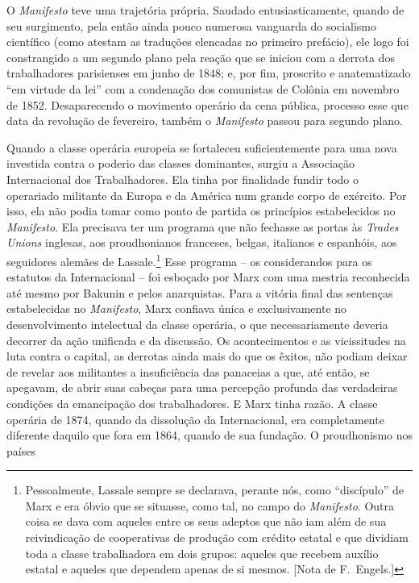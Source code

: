  O \textit{Manifesto} teve uma trajetória própria. Saudado
entusiasticamente, quando de seu surgimento, pela então ainda pouco
numerosa vanguarda do socialismo científico (como atestam as traduções
elencadas no primeiro prefácio), ele logo foi constrangido a um segundo
plano pela reação que se iniciou com a derrota dos trabalhadores
parisienses em junho de 1848; e, por fim, proscrito e anatematizado “em
virtude da lei” com a condenação dos comunistas de Colônia em novembro
de 1852. Desaparecendo o movimento operário da cena pública, processo
esse que data da revolução de fevereiro, também o \textit{Manifesto}
passou para segundo plano.

 Quando a classe operária europeia se fortaleceu suficientemente para
uma nova investida contra o poderio das classes dominantes, surgiu a
Associação Internacional dos Trabalhadores. Ela tinha por finalidade
fundir todo o operariado militante da Europa e da América num grande
corpo de exército. Por isso, ela não podia tomar como ponto de partida
os princípios estabelecidos no \textit{Manifesto}. Ela precisava ter um
programa que não fechasse as portas às \textit{Trades Unions} inglesas,
aos proudhonianos franceses, belgas, italianos e espanhóis, aos
seguidores alemães de Lassale.\footnote{ Pessoalmente, Lassale sempre se
declarava, perante nós, como “discípulo” de Marx e era óbvio que se
situasse, como tal, no campo do\textit{ Manifesto}. Outra coisa se dava
com aqueles entre os seus adeptos que não iam além de sua reivindicação
de cooperativas de produção com crédito estatal e que dividiam toda a
classe trabalhadora em dois grupos: aqueles que recebem auxílio estatal
e aqueles que dependem apenas de si mesmos. [Nota de F.~Engels.]}  Esse
programa – os considerandos para os estatutos da Internacional – foi
esboçado por Marx com uma mestria reconhecida até mesmo por Bakunin e
pelos anarquistas. Para a vitória final das sentenças estabelecidas no
\textit{Manifesto}, Marx confiava única e exclusivamente no
desenvolvimento intelectual da classe operária, o que necessariamente
deveria decorrer da ação unificada e da discussão. Os acontecimentos e
as vicissitudes na luta contra o capital, as derrotas ainda mais do que
os êxitos, não podiam deixar de revelar aos militantes a insuficiência
das panaceias a que, até então, se apegavam, de abrir suas cabeças para
uma percepção profunda das verdadeiras condições da emancipação dos
trabalhadores. E Marx tinha razão. A classe operária de 1874, quando da
dissolução da Internacional, era completamente diferente daquilo que
fora em 1864, quando de sua fundação. O proudhonismo nos países

